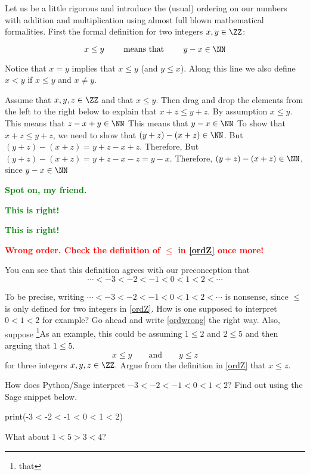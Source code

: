 \documentclass{article}
\newcommand{\red}[1]{\textcolor{red}{\textbf{#1}}}
\newcommand{\green}[1]{\textcolor{green}{\textbf{#1}}}
\begin{document}
Let us be a little rigorous and introduce the (usual) ordering
on our numbers with addition and multiplication using almost full blown
mathematical formalities. First the formal definition for two
integers $x, y\in \ZZ$:

\begin{equation}[emph]\label{ordZ}
x \leq y\qquad \text{ means that }\qquad y - x\in \NN
\end{equation}


Notice that $x = y$ implies that $x\leq y$ (and $y\leq x$).
Along this line we also define $x < y$ if $x \leq y$ and $x\neq y$.

\begin{quizexercise}[showhide]
\begin{orderquiz}
  \question
  Assume that $x, y, z\in \ZZ$ and that $x \leq y$. Then drag and drop the
  elements from the left to the right below to explain that
  $x + z \leq y + z$.
  \answer %
  By assumption $x\leq y$.
  \answer %
  This means that $z - x + y\in \NN$
  \answer %
  This means that $y - x\in \NN$
  \answer %
  To show that $x + z \leq y + z$, we need to show that
  $(y + z) - (x + z) \in \NN$.
  \answer %
  But $(y + z) - (x + z) = y + z - x + z$. Therefore,
  \answer %
  But $(y + z) - (x + z) = y + z - x - z = y - x$. Therefore,
  \answer %
  $(y + z) - (x + z)\in \NN$, since
  \answer %
  $y - x \in \NN$

  \green{Spot on, my friend.}

  \green{This is right!}
  
  \green{This is right!}

  \red{Wrong order. Check the definition of $\leq$ in \eqref{ordZ} once more!}
\end{orderquiz}
\end{quizexercise}


You can
see that this definition agrees with our preconception that
\begin{equation}\label{ordwrong}
\cdots < -3 < -2 < -1 < 0 < 1 < 2 < \cdots
\end{equation}

\begin{exercise}[showhide]
  To be precise, writing $\cdots < -3 < -2 < -1 < 0 < 1 < 2 < \cdots$ is nonsense, since $\leq$ is only defined for two integers in \eqref{ordZ}. How is one supposed to interpret $0 < 1 < 2$ for example? Go ahead and write \eqref{ordwrong} the
  right way. Also, suppose \footnote{that}{As an example, this could be assuming $1 \leq 2$ and $2 \leq 5$ and then
    arguing that $1\leq 5$.}
  $$x \leq y\qquad\text{and}\qquad y\leq z
  $$
  for three integers $x, y, z\in \ZZ$. Argue
  from the definition in \eqref{ordZ} that $x\leq z$.

  How does Python/Sage interpret $-3 < -2 < -1< 0 < 1 < 2$? Find out using the Sage snippet below.
  
  \begin{code}
print(-3 < -2 < -1 < 0 < 1 < 2)
  \end{code}
  
  What about $1 < 5 > 3 < 4$? 
\end{exercise}
\end{document}
